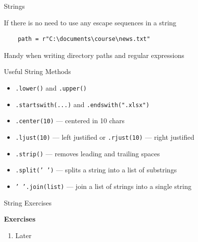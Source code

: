 \documentclass[
	11pt, 
]{beamer}
\begin{document}
\begin{frame}[fragile]{Strings}

If there is no need to use any escape sequences in a string

\begin{verbatim}
    path = r"C:\documents\course\news.txt"
\end{verbatim}

Handy when writing directory paths and regular expressions

\begin{exampleblock}{Useful String Methods}
    \begin{itemize}
        \item \texttt{.lower()} and \texttt{.upper()}
        \item \texttt{.startswith(...)} and \texttt{.endswith(".xlsx")}
        \item \texttt{.center(10)} --- centered in 10 chars
        \item \texttt{.ljust(10)} --- left justified or \texttt{.rjust(10)} --- right justified
        \item \texttt{.strip()} --- removes leading and trailing spaces
        \item \texttt{.split(' ')} --- splits a string into a list of substrings
        \item \texttt{' '.join(list)} --- join a list of strings into a single string 
    \end{itemize}
\end{exampleblock}

\end{frame}


\begin{frame}[fragile]{String Exercises}

\begin{alertblock}{\textbf{Exercises}}
\begin{enumerate}
    \item Later
\end{enumerate}    
\end{alertblock}

\end{frame}


\end{document}
